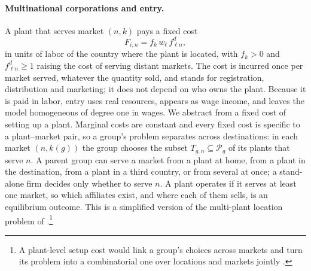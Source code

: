 \documentclass[11pt]{article}
\theoremstyle{definition}
\theoremstyle{remark}
\newcommand{\cP}{\mathcal P}
\begin{document}
\paragraph{Multinational corporations and entry.} A plant that serves market $(n,k)$
pays a fixed cost
\begin{equation}
  F_{i,n}=f_k\,w_\ell\,f^d_{\ell n},
  \label{eq:fixed}
\end{equation}
in units of labor of the country where the plant is located, with $f_k>0$ and
$f^d_{\ell n}\ge1$ raising the cost of serving distant markets. The cost is incurred
once per market served, whatever the quantity sold, and stands for registration,
distribution and marketing; it does not depend on who owns the plant. Because it is
paid in labor, entry uses real resources, appears as wage income, and leaves the model
homogeneous of degree one in wages. We abstract from a fixed cost of setting up a
plant. Marginal costs are constant and every fixed cost is specific to a plant--market
pair, so a group's problem separates across destinations: in each market $(n,k(g))$
the group chooses the subset $T_{g,n}\subseteq\cP_g$ of its plants that serve $n$. A
parent group can serve a market from a plant at home, from a plant in the destination,
from a plant in a third country, or from several at once; a stand-alone firm decides
only whether to serve $n$. A plant operates if it serves at least one market, so which
affiliates exist, and where each of them sells, is an equilibrium outcome. This is a
simplified version of the multi-plant location problem of
\citet{Yang2023}.\footnote{A plant-level setup cost would link a group's choices across markets and
turn its problem into a combinatorial one over locations and markets jointly
\citep{Tintelnot2017}.}
\end{document}
